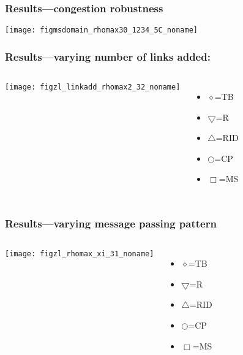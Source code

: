 \begin{frame}
  \frametitle{Results---congestion robustness}
  \begin{center}
    \texttt{[image: figmsdomain\_rhomax30\_1234\_5C\_noname]}
  \end{center}
\end{frame}


\begin{frame}
  \frametitle{Results---varying number of links added:}

  \begin{columns}
    \texttt{[image: figzl\_linkadd\_rhomax2\_32\_noname]}
    \begin{itemize}
    \item[] 
        {\Large$\diamond$}=TB
    \item[]
        $\bigtriangledown$=R
    \item[]
        $\bigtriangleup$=RID 
    \item[]
        {\small$\bigcirc$}=CP
    \item[]
        $\Box$=MS 
    \end{itemize}
  \end{columns}

\end{frame}

\begin{frame}
  \frametitle{Results---varying message passing pattern}

  \begin{columns}
    \texttt{[image: figzl\_rhomax\_xi\_31\_noname]}
    \begin{itemize}
    \item[] 
        {\Large$\diamond$}=TB
    \item[]
        $\bigtriangledown$=R
    \item[]
        $\bigtriangleup$=RID 
    \item[]
        {\small$\bigcirc$}=CP
    \item[]
        $\Box$=MS 
    \end{itemize}
  \end{columns}

\end{frame}



